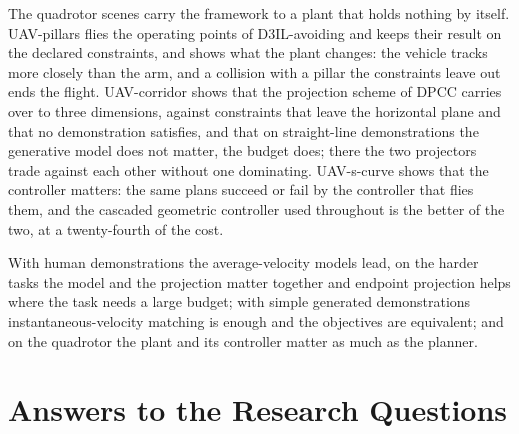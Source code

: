 The quadrotor scenes carry the framework to a plant that holds nothing by itself. UAV-pillars flies
the operating points of D3IL-avoiding and keeps their result on the declared constraints, and shows
what the plant changes: the vehicle tracks more closely than the arm, and a collision with a pillar the
constraints leave out ends the flight. UAV-corridor shows that the projection scheme of \ac{DPCC}
carries over to three dimensions, against constraints that leave the horizontal plane and that no
demonstration satisfies, and that on straight-line demonstrations the generative model does not
matter, the budget does; there the two projectors trade against each other without one dominating.
UAV-s-curve shows that the controller matters: the same plans succeed or fail by the controller that
flies them, and the cascaded geometric controller used throughout is the better of the two, at a
twenty-fourth of the cost.

With human demonstrations the average-velocity models lead, on the harder tasks the
model and the projection matter together and endpoint projection helps where the task needs a large
budget; with simple generated demonstrations instantaneous-velocity matching is enough and the
objectives are equivalent; and on the quadrotor the plant and its controller matter as much as the
planner.

\section{Answers to the Research Questions}\label{sec:conc:rqs}

